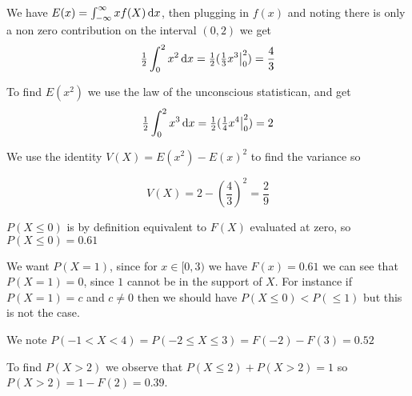 \documentclass[11pt,largemargins]{homework}
\begin{document}
\question
\begin{alphaparts}
    \questionpart
    We have $E(x) = \int_{-\infty}^{\infty} xf(X) \dif x$, then plugging in $f(x)$ and noting there is only a non zero contribution 
    on the interval $(0, 2)$ we get 
    \[ \tfrac{1}{2} \int_{0}^{2} x^2 \dif x = \tfrac{1}{2} (\tfrac{1}{3}x^3 \big|_0^2) = \frac{4}{3} \]
    
    \questionpart
    To find $E(x^2)$ we use the law of the unconscious statistican, and get 
    \[ \tfrac{1}{2} \int_{0}^{2} x^3 \dif x = \tfrac{1}{2} (\tfrac{1}{4}x^4 \big|_0^2) = 2 \]

    \questionpart 
    We use the identity $V(X) = E(x^2) - E(x)^2$ to find the variance so 

    \[V(X) = 2 -(\frac{4}{3})^2 = \frac{2}{9} \] 

\end{alphaparts}

\newpage
\question

\begin{alphaparts}
    \questionpart
    $P(X \leq 0)$ is by definition equivalent to $F(X)$ evaluated at zero, so $P(X \leq 0) = 0.61$

    \questionpart
    We want $P(X = 1)$, since for $x \in [0, 3)$ we have $F(x) = 0.61$ we can see that $P(X = 1) = 0$, since $1$ cannot be in the support 
    of $X$. For instance if $P(X = 1) = c$ and $c \neq 0$ then we should have $P(X \leq 0) < P(\leq 1)$ but this is not the case. 

    \questionpart 
    We note  $P(-1 < X < 4) = P(-2 \leq X \leq 3)  = F(-2) - F(3) = 0.52$ 

    \questionpart 
    To find $P(X > 2)$ we observe that $P(X \leq 2) + P(X > 2) = 1$ so $P(X > 2) = 1 - F(2) = 0.39$.  
\end{alphaparts}
\end{document}
